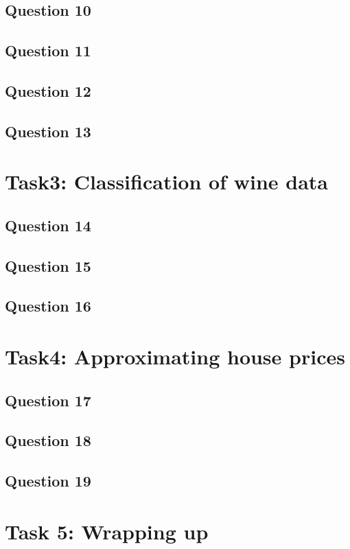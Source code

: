 \documentclass[a4paper]{article}
\begin{document}
\subsection*{Question 10}
\subsection*{Question 11}
\subsection*{Question 12}
\subsection*{Question 13}

\section{Task3: Classification of wine data}
\subsection*{Question 14}
\subsection*{Question 15}
\subsection*{Question 16}

\section{Task4: Approximating house prices}

\subsection*{Question 17}
\subsection*{Question 18}
\subsection*{Question 19}

\section{Task 5: Wrapping up}
\end{document}
